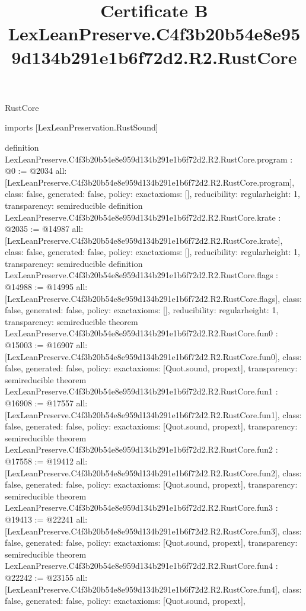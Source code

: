 \begin{lexlean}{RustCore}
\title{Certificate B LexLeanPreserve.C4f3b20b54e8e959d134b291e1b6f72d2.R2.RustCore}
\begin{coremodule}
imports [LexLeanPreservation.RustSound]

definition LexLeanPreserve.C4f3b20b54e8e959d134b291e1b6f72d2.R2.RustCore.program : @0 := @2034 {
  all: [LexLeanPreserve.C4f3b20b54e8e959d134b291e1b6f72d2.R2.RustCore.program],
  class: false,
  generated: false,
  policy: exact{axioms: []},
  reducibility: regular{height: 1},
  transparency: semireducible
}
definition LexLeanPreserve.C4f3b20b54e8e959d134b291e1b6f72d2.R2.RustCore.krate : @2035 := @14987 {
  all: [LexLeanPreserve.C4f3b20b54e8e959d134b291e1b6f72d2.R2.RustCore.krate],
  class: false,
  generated: false,
  policy: exact{axioms: []},
  reducibility: regular{height: 1},
  transparency: semireducible
}
definition LexLeanPreserve.C4f3b20b54e8e959d134b291e1b6f72d2.R2.RustCore.flags : @14988 := @14995 {
  all: [LexLeanPreserve.C4f3b20b54e8e959d134b291e1b6f72d2.R2.RustCore.flags],
  class: false,
  generated: false,
  policy: exact{axioms: []},
  reducibility: regular{height: 1},
  transparency: semireducible
}
theorem LexLeanPreserve.C4f3b20b54e8e959d134b291e1b6f72d2.R2.RustCore.fun0 : @15003 := @16907 {
  all: [LexLeanPreserve.C4f3b20b54e8e959d134b291e1b6f72d2.R2.RustCore.fun0],
  class: false,
  generated: false,
  policy: exact{axioms: [Quot.sound, propext]},
  transparency: semireducible
}
theorem LexLeanPreserve.C4f3b20b54e8e959d134b291e1b6f72d2.R2.RustCore.fun1 : @16908 := @17557 {
  all: [LexLeanPreserve.C4f3b20b54e8e959d134b291e1b6f72d2.R2.RustCore.fun1],
  class: false,
  generated: false,
  policy: exact{axioms: [Quot.sound, propext]},
  transparency: semireducible
}
theorem LexLeanPreserve.C4f3b20b54e8e959d134b291e1b6f72d2.R2.RustCore.fun2 : @17558 := @19412 {
  all: [LexLeanPreserve.C4f3b20b54e8e959d134b291e1b6f72d2.R2.RustCore.fun2],
  class: false,
  generated: false,
  policy: exact{axioms: [Quot.sound, propext]},
  transparency: semireducible
}
theorem LexLeanPreserve.C4f3b20b54e8e959d134b291e1b6f72d2.R2.RustCore.fun3 : @19413 := @22241 {
  all: [LexLeanPreserve.C4f3b20b54e8e959d134b291e1b6f72d2.R2.RustCore.fun3],
  class: false,
  generated: false,
  policy: exact{axioms: [Quot.sound, propext]},
  transparency: semireducible
}
theorem LexLeanPreserve.C4f3b20b54e8e959d134b291e1b6f72d2.R2.RustCore.fun4 : @22242 := @23155 {
  all: [LexLeanPreserve.C4f3b20b54e8e959d134b291e1b6f72d2.R2.RustCore.fun4],
  class: false,
  generated: false,
  policy: exact{axioms: [Quot.sound, propext]},
}
\end{coremodule}
\end{lexlean}
